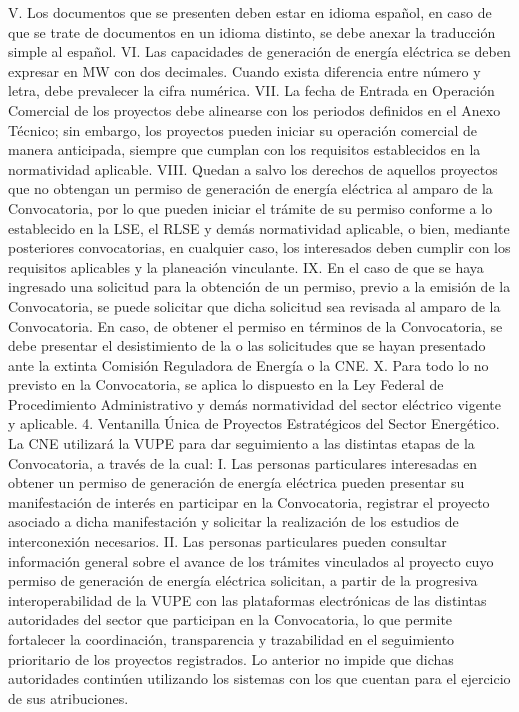 V.	Los documentos que se presenten deben estar en idioma español, en caso de que se trate de documentos en un idioma distinto, se debe anexar la traducción simple al español.
VI.	Las capacidades de generación de energía eléctrica se deben expresar en MW con dos decimales. Cuando exista diferencia entre número y letra, debe prevalecer la cifra numérica.
VII.	La fecha de Entrada en Operación Comercial de los proyectos debe alinearse con los periodos definidos en el Anexo Técnico; sin embargo, los proyectos pueden iniciar su operación comercial de manera anticipada, siempre que cumplan con los requisitos establecidos en la normatividad aplicable.
VIII.	Quedan a salvo los derechos de aquellos proyectos que no obtengan un permiso de generación de energía eléctrica al amparo de la Convocatoria, por lo que pueden iniciar el trámite de su permiso conforme a lo establecido en la LSE, el RLSE y demás normatividad aplicable, o bien, mediante posteriores convocatorias, en cualquier caso, los interesados deben cumplir con los requisitos aplicables y la planeación vinculante.
IX.	En el caso de que se haya ingresado una solicitud para la obtención de un permiso, previo a la emisión de la Convocatoria, se puede solicitar que dicha solicitud sea revisada al amparo de la Convocatoria. En caso, de obtener el permiso en términos de la Convocatoria, se debe presentar el desistimiento de la o las solicitudes que se hayan presentado ante la extinta Comisión Reguladora de Energía o la CNE.
X.	Para todo lo no previsto en la Convocatoria, se aplica lo dispuesto en la Ley Federal de Procedimiento Administrativo y demás normatividad del sector eléctrico vigente y aplicable.
4. Ventanilla Única de Proyectos Estratégicos del Sector Energético.
La CNE utilizará la VUPE para dar seguimiento a las distintas etapas de la Convocatoria, a través de la cual:
I.	Las personas particulares interesadas en obtener un permiso de generación de energía eléctrica pueden presentar su manifestación de interés en participar en la Convocatoria, registrar el proyecto asociado a dicha manifestación y solicitar la realización de los estudios de interconexión necesarios.
II.	Las personas particulares pueden consultar información general sobre el avance de los trámites vinculados al proyecto cuyo permiso de generación de energía eléctrica solicitan, a partir de la progresiva interoperabilidad de la VUPE con las plataformas electrónicas de las distintas autoridades del sector que participan en la Convocatoria, lo que permite fortalecer la coordinación, transparencia y trazabilidad en el seguimiento prioritario de los proyectos registrados. Lo anterior no impide que dichas autoridades continúen utilizando los sistemas con los que cuentan para el ejercicio de sus atribuciones.
